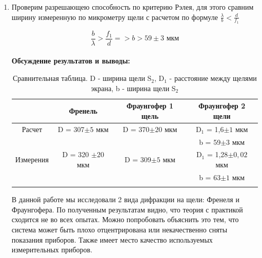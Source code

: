 \documentclass[a4paper, 12pt]{article}%
\begin{document}
\begin{enumerate}
	\item Проверим разрешающею способность по критерию Рэлея, для этого сравним ширину измеренную по микрометру щели с расчетом по формуле $\frac{\lambda}{b} < \frac{d}{f_1}$
	
	
	$$ \frac{b}{\lambda} > \frac{f_1}{d} => b > 59 \pm 3 \text{ мкм}$$\\
	
	\textbf{Обсуждение результатов и выводы: }\\
	
	
	 \begin{longtable}{|c|c|c|c|}
		\hline
		 & Френель & Фраунгофер 1 щель & Фраунгофер 2 щели\\ \hline
		Расчет & D = 307$\pm 5$ мкм& D = 370$\pm 20$ мкм &  D$_1$ = 1,6$\pm 1$ мкм\\ 
		& & & b = 59$\pm 3$ мкм \\ \hline
		
		Измерения & D = 320 $\pm 20$ мкм & D = 309$\pm 5$ мкм & D$_1$ = 1,28$\pm 0,02$ мкм\\ 
		& & & b = 63$\pm 1$ мкм\\ \hline

		\caption{Сравнительная таблица. D - ширина щели S$_2$, D$_1$ - расстояние между щелями экрана, b -  ширина щели S$_2$}
	\end{longtable}

	В данной работе мы исследовали 2 вида дифракции на щели: Френеля и Фраунгофера. По полученным результатам видно, что теория с практикой сходится не во всех опытах. Можно попробовать объяснить это тем, что система может быть плохо отцентрирована или некачественно сняты показания приборов. Также имеет место качество используемых измерительных приборов.
	
	
	
	
	
	\end{enumerate}
	
	
	
	
	
	
	
	
	
	
	
	
	
	
	
	
	
	
	
	
	
	
	
	
	
	
	
	
	
	
	
	
\end{document}
